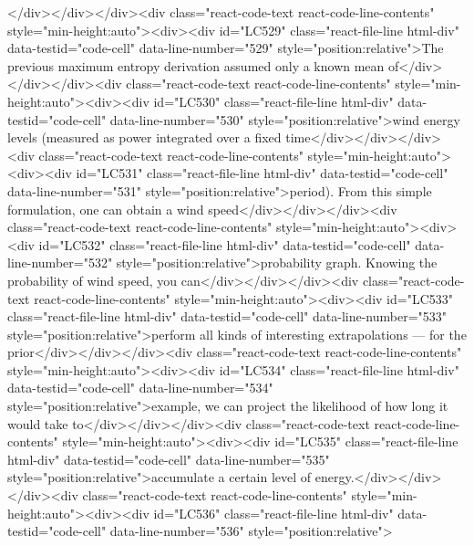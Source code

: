 {{{{</div></div></div><div class="react-code-text react-code-line-contents" style="min-height:auto"><div><div id="LC529" class="react-file-line html-div" data-testid="code-cell" data-line-number="529" style="position:relative">The previous maximum entropy derivation assumed only a known mean of</div></div></div><div class="react-code-text react-code-line-contents" style="min-height:auto"><div><div id="LC530" class="react-file-line html-div" data-testid="code-cell" data-line-number="530" style="position:relative">wind energy levels (measured as power integrated over a fixed time</div></div></div><div class="react-code-text react-code-line-contents" style="min-height:auto"><div><div id="LC531" class="react-file-line html-div" data-testid="code-cell" data-line-number="531" style="position:relative">period). From this simple formulation, one can obtain a wind speed</div></div></div><div class="react-code-text react-code-line-contents" style="min-height:auto"><div><div id="LC532" class="react-file-line html-div" data-testid="code-cell" data-line-number="532" style="position:relative">probability graph. Knowing the probability of wind speed, you can</div></div></div><div class="react-code-text react-code-line-contents" style="min-height:auto"><div><div id="LC533" class="react-file-line html-div" data-testid="code-cell" data-line-number="533" style="position:relative">perform all kinds of interesting extrapolations --- for the prior</div></div></div><div class="react-code-text react-code-line-contents" style="min-height:auto"><div><div id="LC534" class="react-file-line html-div" data-testid="code-cell" data-line-number="534" style="position:relative">example, we can project the likelihood of how long it would take to</div></div></div><div class="react-code-text react-code-line-contents" style="min-height:auto"><div><div id="LC535" class="react-file-line html-div" data-testid="code-cell" data-line-number="535" style="position:relative">accumulate a certain level of energy.</div></div></div><div class="react-code-text react-code-line-contents" style="min-height:auto"><div><div id="LC536" class="react-file-line html-div" data-testid="code-cell" data-line-number="536" style="position:relative">
}}}}
